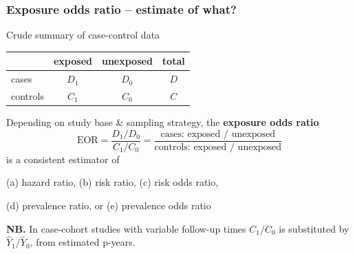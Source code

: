 \documentclass[12pt,dvipsnames,t,handout%
,aspectratio=169%
]{beamer}
\begin{document}

\begin{frame}
\frametitle{\large Exposure odds ratio -- estimate of what?}

\bi
\item
Crude summary of case-control data

\medskip
\begin{center}
\begin{tabular}{l c c c}
\hline
               & exposed & unexposed & total\\
\hline
cases          & $D_1$     & $D_0$       & $D$\\
controls       & $C_1$     & $C_0$       & $C$\\
\hline
\end{tabular}
\end{center}

\pause
\bigskip
\item  Depending on study base \& sampling strategy,   
the {\bf exposure odds ratio} %
$$
  \text{EOR} 
    = \frac{D_1/ D_0}{C_1/C_0}
    = \frac{\text{cases: exposed / unexposed}}
           {\text{controls: exposed / unexposed}}
$$
\pause
is a consistent estimator of  
\bi
{\normalsize 
\item[ ]
 (a) hazard ratio, (b) risk ratio,
(c) risk odds ratio, \pause \medskip
\item[ ] (d) prevalence ratio, or (e) prevalence
odds ratio 
}
\ei
\pause
\item {\bf NB.} In case-cohort studies with variable follow-up times
$C_1/C_0$ is substituted by $\widehat Y_{1}/\widehat Y_{0}$, 
from estimated p-years.
      
 \ei  
\end{frame}
\end{document}
